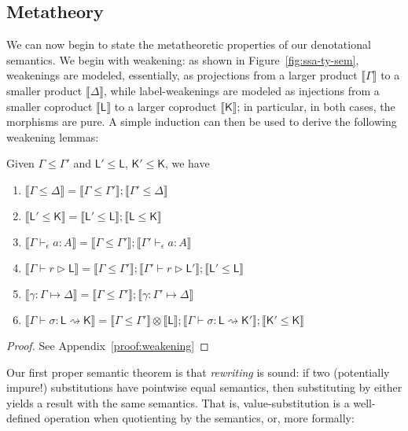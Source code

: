 \documentclass[acmsmall,screen,review]{acmart}
\newcommand{\ms}[1]{\ensuremath{\mathsf{#1}}}
\newcommand{\hasty}[4]{#1 \vdash_{#2} #3: {#4}}
\newcommand{\haslb}[3]{#1 \vdash #2 \rhd #3}
\newcommand{\issubst}[3]{#1: #2 \mapsto #3}
\newcommand{\lbsubst}[4]{#1 \vdash #2: #3 \rightsquigarrow #4}
\newcommand{\dnt}[1]{\llbracket{#1}\rrbracket}
\begin{document}
\subsection{Metatheory}

We can now begin to state the metatheoretic properties of our denotational semantics. We begin with
weakening: as shown in Figure~\ref{fig:ssa-ty-sem}, weakenings are modeled, essentially, as
projections from a larger product $\dnt{\Gamma}$ to a smaller product $\dnt{\Delta}$, while
label-weakenings are modeled as injections from a smaller coproduct $\dnt{\ms{L}}$ to a larger
coproduct $\dnt{\ms{K}}$; in particular, in both cases, the morphisms are pure.  A simple induction
can then be used to derive the following weakening lemmas:
\begin{lemma}[name=(Label) Weakening, restate=weakeninglem]
  Given $\Gamma \leq \Gamma'$ and $\ms{L}' \leq \ms{L}$, $\ms{K}' \leq \ms{K}$, we have
  \begin{enumerate}[label=(\alph*)]
    \item $\dnt{\Gamma \leq \Delta} = \dnt{\Gamma \leq \Gamma'};\dnt{\Gamma' \leq \Delta}$
      \label{itm:varwk}
    \item $\dnt{\ms{L}' \leq \ms{K}} = \dnt{\ms{L}' \leq \ms{L}};\dnt{\ms{L} \leq \ms{K}}$
      \label{itm:lbwk}
    \item $\dnt{\hasty{\Gamma}{\epsilon}{a}{A}} 
      = \dnt{\Gamma \leq \Gamma'};\dnt{\hasty{\Gamma'}{\epsilon}{a}{A}}$
      \label{itm:expwk}
    \item $\dnt{\haslb{\Gamma}{r}{\ms{L}}}
      = \dnt{\Gamma \leq \Gamma'}
      ; \dnt{\haslb{\Gamma'}{r}{\ms{L}'}}
      ; \dnt{\ms{L}' \leq \ms{L}}$
      \label{itm:regwk}
    \item $\dnt{\issubst{\gamma}{\Gamma}{\Delta}}
      = \dnt{\Gamma \leq \Gamma'};\dnt{\issubst{\gamma}{\Gamma'}{\Delta}}$
      \label{itm:substwk}
    \item $\dnt{\lbsubst{\Gamma}{\sigma}{\ms{L}}{\ms{K}}}
      = \dnt{\Gamma \leq \Gamma'} \otimes \dnt{\ms{L}}
      ; \dnt{\lbsubst{\Gamma}{\sigma}{\ms{L}}{\ms{K}'}}
      ; \dnt{\ms{K}' \leq \ms{K}}
      $
      \label{itm:lbsubstwk}
  \end{enumerate}
\end{lemma}
\begin{proof}
  See Appendix~\ref{proof:weakening}
\end{proof}

Our first proper semantic theorem is that \emph{rewriting} is sound: if two (potentially impure!)
substitutions have pointwise equal semantics, then substituting by either yields a result with
the same semantics. That is, value-substitution is a well-defined operation when quotienting by the
semantics, or, more formally:
\end{document}
